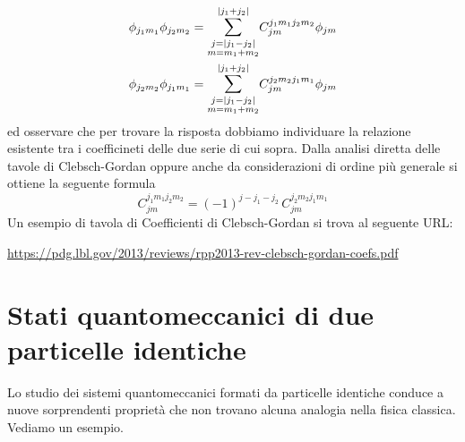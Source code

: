 \begin{gather*}
    \phi_{j_{1}m_{1}} \phi_{j_{2}m_{2}} = \mathlarger{\sum}_{\substack{j=| j_{1}-j_{2}| \\ m = m_{1}+m_{2}} }^{| j_{1}+j_{2}|} C_{jm}^{j_{1}m_{1}j_{2}m_{2}} \phi_{jm}\\
    \phi_{j_{2}m_{2}} \phi_{j_{1}m_{1}} = \mathlarger{\sum}_{\substack{j=| j_{1}-j_{2}| \\ m = m_{1}+m_{2}} }^{| j_{1}+j_{2}|} C_{jm}^{j_{2}m_{2}j_{1}m_{1}} \phi_{jm}
\end{gather*}
ed osservare che per trovare la risposta dobbiamo individuare la relazione esistente tra i coefficineti delle due serie di cui sopra.
Dalla analisi diretta delle tavole di Clebsch-Gordan oppure anche da considerazioni di ordine più generale si ottiene la seguente formula
\[
    C_{jm}^{j_{1}m_{1}j_{2}m_{2}} = (-1)^{j-j_1-j_2} \, C_{jm}^{j_{2}m_{2}j_{1}m_{1}}
\]
Un esempio di tavola di Coefficienti di Clebsch-Gordan si trova al seguente URL:
\begin{center}
    \url{https://pdg.lbl.gov/2013/reviews/rpp2013-rev-clebsch-gordan-coefs.pdf}
\end{center}

\section{Stati quantomeccanici di due particelle identiche}\label{sec:particelle-identiche}

Lo studio dei sistemi quantomeccanici formati da particelle identiche conduce a nuove
sorprendenti proprietà che non trovano alcuna analogia nella fisica
classica.
Vediamo un esempio.

